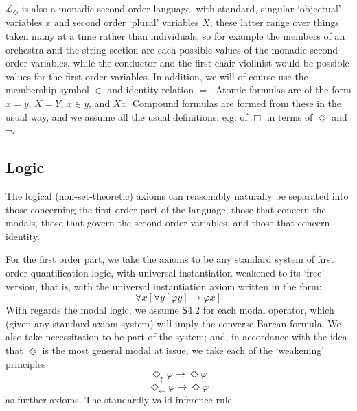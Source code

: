 \documentclass{article}
\theoremstyle{definition}
\newcommand{\du}{\Diamond_\uparrow}
\newcommand{\dl}{\Diamond_\leftarrow}
\begin{document}
$\mathcal{L}_\Diamond$ is also a monadic second order language, 
with standard, singular `objectual' variables $x$ 
and second order `plural' variables $X$; these latter range over things taken many at 
a time rather than individuals; so for example the members of an orchestra and the string 
section are each possible values of the monadic second order variables, while the conductor 
and the first chair violinist would be possible values for the first order variables. 
In addition, we will of course use the membership symbol $\in$ and identity relation
$=$. Atomic formulas are of the form $x = y$, $X = Y$, $x \in y$, and $Xx$. Compound 
formulas are formed from these in the usual way, and we assume all the usual definitions,
e.g. of $\Box$ in terms of $\Diamond$ and $\neg$.
\subsection{Logic}
The logical (non-set-theoretic) axioms can reasonably naturally be separated 
into those concerning the first-order part of the language, those that concern 
the modals, those that govern the second order variables, 
and those that concern identity.

For the first order part, we take the axioms to be any standard system of first
order quantification logic, with universal instantiation weakened to its `free'
version, that is, with the universal instantiation axiom written in the form: 
\begin{equation}
    \forall x [\forall y [ \varphi y] \rightarrow \varphi x]
\end{equation}
With regards the modal logic, we assume $\mathsf{S4.2}$ for each modal operator,
which (given any standard axiom system) will imply the converse Barcan formula. 
We also take necessitation to be part of the system; and, in 
accordance with the idea that $\Diamond$ is the most general modal at issue, we take 
each of the `weakening' principles
\begin{equation}
    \du \varphi \rightarrow \Diamond \varphi
\end{equation}
\begin{equation}
    \dl \varphi \rightarrow \Diamond \varphi
\end{equation}
as further axioms.
The standardly valid inference rule 
\begin{prooftree}
\end{prooftree}
\end{document}
